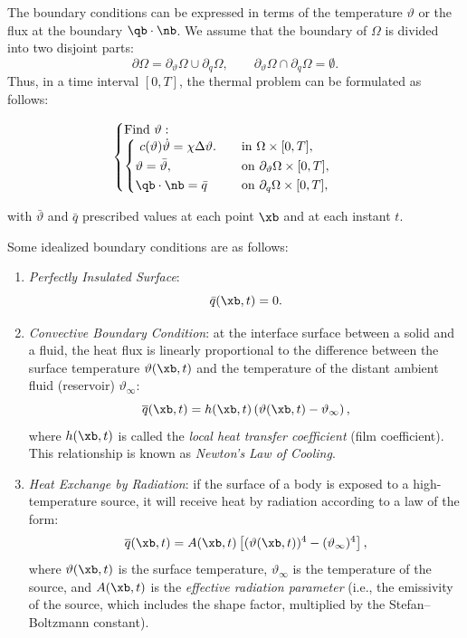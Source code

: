 The boundary conditions can be expressed in terms of the temperature $\vartheta$ or the flux at the boundary $\qb \cdot \nb$. We assume that the boundary of $\Omega$ is divided into two disjoint parts:
\begin{equation}
	\partial \Omega = \partial_\vartheta \Omega \cup \partial_q \Omega, \qquad \partial_\vartheta \Omega \cap \partial_q \Omega = \emptyset.
\end{equation}
Thus, in a time interval $[0,T]$, the thermal problem can be formulated as follows:
\begin{definition}
	\begin{equation}
		\begin{cases}
			\mathrm{Find~}\mathbf{\vartheta}:\\
			\begin{cases}
				\begin{aligned}
					&\ c(\vartheta)\dot{\vartheta} = \chi \Delta \vartheta. \quad &&\mathrm{in~}\Omega \times [0,T],\\
					&\vartheta = \bar{\vartheta}, \quad &&\mathrm{on~}\partial_\vartheta \Omega \times [0,T],\\
					&\qb \cdot \nb = \bar{q} &&\mathrm{on~}\partial_q \Omega \times [0,T],
				\end{aligned}
			\end{cases}
		\end{cases}
	\end{equation}
\end{definition}
with $\bar{\vartheta}$ and $\bar{q}$ prescribed values at each point $\xb$ and at each instant $t$.

Some idealized boundary conditions are as follows:
\begin{enumerate}
	\item \textit{Perfectly Insulated Surface}:
	\begin{equation}
		\bar{q}(\xb, t) = 0.
	\end{equation}
	\item \textit{Convective Boundary Condition}: at the interface surface between a solid and a fluid, the heat flux is linearly proportional to the difference between the surface temperature \( \vartheta(\xb,t) \) and the temperature of the distant ambient fluid (reservoir) \( \vartheta_\infty \):
	\[
	\overline{q}(\xb,t) = h(\xb,t) \left( \vartheta(\xb,t) - \vartheta_\infty \right), 
	\]
	where \( h(\xb,t) \) is called the \textit{local heat transfer coefficient} (film coefficient). This relationship is known as \emph{Newton's Law of Cooling}.
	\item \textit{Heat Exchange by Radiation}: if the surface of a body is exposed to a high-temperature source, it will receive heat by radiation according to a law of the form:  
	\[
	\overline{q}(\xb,t) = A(\xb,t) \left[ (\vartheta(\xb,t))^4 - (\vartheta_\infty)^4 \right], 
	\]  
	where \( \vartheta(\xb,t) \) is the surface temperature, \( \vartheta_\infty \) is the temperature of the source, and \( A(\xb,t) \) is the \textit{effective radiation parameter} (i.e., the emissivity of the source, which includes the shape factor, multiplied by the Stefan–Boltzmann constant).	
\end{enumerate}


